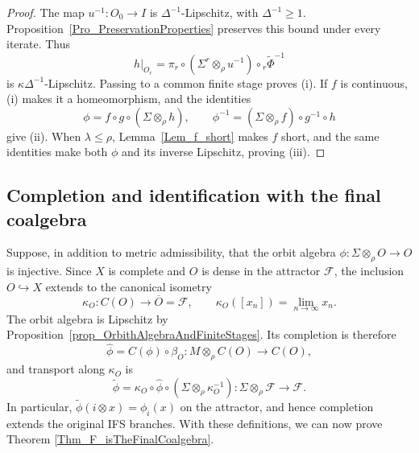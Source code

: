 \documentclass{sn-jnl}%
\theoremstyle{thmstyleone}%
\theoremstyle{thmstyletwo}%
\theoremstyle{thmstylethree}%
\newcommand{\M}{\Sigma}
\newcommand{\Fw}{\M\otimes_{\w}}
\newcommand{\Fwi}[1]{\M^{#1}\otimes_{\w}}
\newcommand{\f}{\phi}
\newcommand{\tf}{\tilde{\Phi}}
\newcommand{\w}{\rho}
\begin{document}
\begin{proof}
The map $u^{-1}:O_0\to I$ is $\Delta^{-1}$-Lipschitz, with $\Delta^{-1}\geq1$. Proposition~\ref{Pro_PreservationProperties} preserves this bound under every iterate. Thus 
\begin{equation} 
\nonumber
    h|_{O_r}=\pi_r\circ(\Fwi{r}u^{-1})\circ{}_r\tf^{-1}
\end{equation}
is $\kappa\Delta^{-1}$-Lipschitz. Passing to a common finite stage proves (i). If $f$ is continuous, (i) makes it a homeomorphism, and the identities
\begin{equation} 
\nonumber
    \f=f\circ g\circ(\Fw h), \qquad \f^{-1}=(\Fw f)\circ g^{-1}\circ h
\end{equation}
give (ii). When $\lambda\leq\rho$, Lemma~\ref{Lem_f_short} makes $f$ short, and the same identities make both $\f$ and its inverse Lipschitz, proving (iii).
\end{proof}

\subsection{Completion and identification with the final coalgebra}
Suppose, in addition to metric admissibility, that the orbit algebra $\f:\Fw O\to O$ is injective. Since $X$ is complete and $O$ is dense in the attractor $\mathcal F$, the inclusion $O\hookrightarrow X$ extends to the canonical isometry 
\begin{equation} 
\nonumber
    \kappa_O:C(O)\longrightarrow\overline O=\mathcal F, \qquad \kappa_O([x_n])=\lim_{n\to\infty}x_n.
\end{equation}
The orbit algebra is Lipschitz by Proposition~\ref{prop_OrbithAlgebraAndFiniteStages}. Its completion is therefore
\begin{equation} 
\nonumber
    \widehat{\f} = C(\f)\circ\beta_O: M\otimes_\rho C(O)\longrightarrow C(O),
\end{equation}
and transport along $\kappa_O$ is
\begin{equation} 
\nonumber
    \widetilde{\f} = \kappa_O\circ \widehat{\f}\circ (\Fw\kappa_O^{-1}):\Fw\mathcal F \longrightarrow\mathcal F.
\end{equation}
In particular, $\widetilde{\f}(i\otimes x)=\f_i(x)$ on the attractor, and hence completion extends the original IFS branches. With these definitions, we can now prove Theorem \ref{Thm_F_isTheFinalCoalgebra}.
\end{document}

